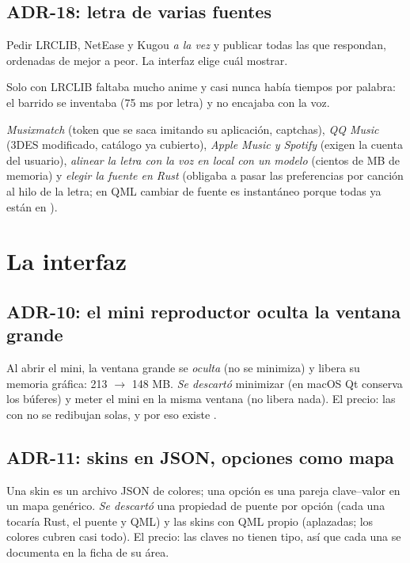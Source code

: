 \subsection{ADR-18: letra de varias fuentes}

\begin{description}[style=nextline, leftmargin=0pt]
  \item[Se eligió] Pedir LRCLIB, NetEase y Kugou \emph{a la vez} y publicar todas las que
  respondan, ordenadas de mejor a peor. La interfaz elige cuál mostrar.
  \item[Por qué] Solo con LRCLIB faltaba mucho anime y casi nunca había tiempos por palabra:
  el barrido se inventaba (75 ms por letra) y no encajaba con la voz.
  \item[Se descartó] \emph{Musixmatch} (token que se saca imitando su aplicación, captchas),
  \emph{QQ Music} (3DES modificado, catálogo ya cubierto), \emph{Apple Music y Spotify}
  (exigen la cuenta del usuario), \emph{alinear la letra con la voz en local con un modelo}
  (cientos de MB de memoria) y \emph{elegir la fuente en Rust} (obligaba a pasar las
  preferencias por canción al hilo de la letra; en QML cambiar de fuente es instantáneo porque
  todas ya están en ).
\end{description}

\section{La interfaz}

\subsection{ADR-10: el mini reproductor oculta la ventana grande}

Al abrir el mini, la ventana grande se \emph{oculta} (no se minimiza) y 
libera su memoria gráfica: 213 $\rightarrow$ 148 MB. \emph{Se descartó} minimizar (en macOS Qt
conserva los búferes) y meter el mini en la misma ventana (no libera nada). El precio: las
 con  no se redibujan solas, y por eso existe
.

\subsection{ADR-11: skins en JSON, opciones como mapa}

Una skin es un archivo JSON de colores; una opción es una pareja clave--valor en un mapa
genérico. \emph{Se descartó} una propiedad de puente por opción (cada una tocaría Rust, el
puente y QML) y las skins con QML propio (aplazadas; los colores cubren casi todo). El precio:
las claves no tienen tipo, así que cada una se documenta en la ficha de su área.


